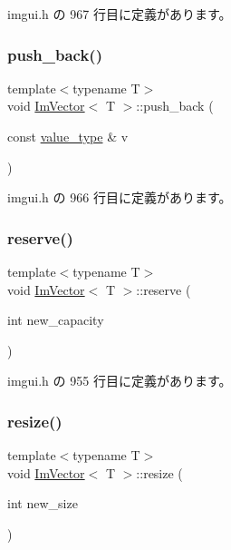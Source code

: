  imgui.\+h の 967 行目に定義があります。

\mbox{\label{class_im_vector_a68387993f2a5f5c3b2a7139d9ab778b8}} 
\subsubsection{\texorpdfstring{push\+\_\+back()}{push\_back()}}
{\footnotesize\ttfamily template$<$typename T$>$ \\
void \mbox{\hyperlink{class_im_vector}{Im\+Vector}}$<$ T $>$\+::push\+\_\+back (\begin{DoxyParamCaption}\item[{const \mbox{\hyperlink{class_im_vector_a8bd77e4e7581d8e5f9e98d7c2f3c2a80}{value\+\_\+type}} \&}]{v }\end{DoxyParamCaption})\hspace{0.3cm}{\ttfamily [inline]}}



 imgui.\+h の 966 行目に定義があります。

\mbox{\label{class_im_vector_a0f14f5736c3372157856eebb67123b75}} 
\subsubsection{\texorpdfstring{reserve()}{reserve()}}
{\footnotesize\ttfamily template$<$typename T$>$ \\
void \mbox{\hyperlink{class_im_vector}{Im\+Vector}}$<$ T $>$\+::reserve (\begin{DoxyParamCaption}\item[{int}]{new\+\_\+capacity }\end{DoxyParamCaption})\hspace{0.3cm}{\ttfamily [inline]}}



 imgui.\+h の 955 行目に定義があります。

\mbox{\label{class_im_vector_ac371dd62e56ae486b1a5038cf07eee56}} 
\subsubsection{\texorpdfstring{resize()}{resize()}\hspace{0.1cm}{\footnotesize\ttfamily [1/2]}}
{\footnotesize\ttfamily template$<$typename T$>$ \\
void \mbox{\hyperlink{class_im_vector}{Im\+Vector}}$<$ T $>$\+::resize (\begin{DoxyParamCaption}\item[{int}]{new\+\_\+size }\end{DoxyParamCaption})\hspace{0.3cm}{\ttfamily [inline]}}



